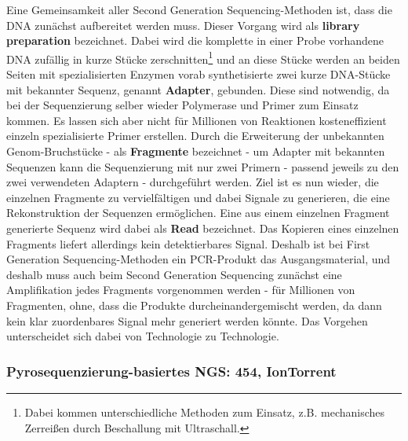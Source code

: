 Eine Gemeinsamkeit aller Second Generation Sequencing-Methoden ist, dass die DNA zunächst aufbereitet werden muss. Dieser Vorgang wird als \textbf{library preparation} bezeichnet. Dabei wird die komplette in einer Probe vorhandene DNA zufällig in kurze Stücke zerschnitten\footnote{Dabei kommen unterschiedliche Methoden zum Einsatz, z.B. mechanisches Zerreißen durch Beschallung mit Ultraschall.} und an diese Stücke werden an beiden Seiten mit spezialisierten Enzymen vorab synthetisierte zwei kurze DNA-Stücke mit bekannter Sequenz, genannt \textbf{Adapter}, gebunden. Diese sind notwendig, da bei der Sequenzierung selber wieder Polymerase und Primer zum Einsatz kommen. Es lassen sich aber nicht für Millionen von Reaktionen kosteneffizient einzeln spezialisierte Primer erstellen. Durch die Erweiterung der unbekannten Genom-Bruchstücke - als \textbf{Fragmente} bezeichnet - um Adapter mit bekannten Sequenzen kann die Sequenzierung mit nur zwei Primern - passend jeweils zu den zwei verwendeten Adaptern - durchgeführt werden. Ziel ist es nun wieder, die einzelnen Fragmente zu vervielfältigen und dabei Signale zu generieren, die eine Rekonstruktion der Sequenzen ermöglichen. Eine aus einem einzelnen Fragment generierte Sequenz wird dabei als \textbf{Read} bezeichnet. Das Kopieren eines einzelnen Fragments liefert allerdings kein detektierbares Signal. Deshalb ist bei First Generation Sequencing-Methoden ein PCR-Produkt das Ausgangsmaterial, und deshalb muss auch beim Second Generation Sequencing zunächst eine Amplifikation jedes Fragments vorgenommen werden - für Millionen von Fragmenten, ohne, dass die Produkte durcheinandergemischt werden, da dann kein klar zuordenbares Signal mehr generiert werden könnte. Das Vorgehen unterscheidet sich dabei von Technologie zu Technologie. 

\subsubsection{Pyrosequenzierung-basiertes NGS: 454, IonTorrent}

